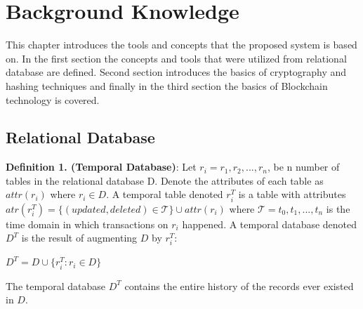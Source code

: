 \chapter{Background Knowledge}
\label{chap:background}

This chapter introduces the tools and concepts that the proposed system is based on. In the first section the concepts and tools that were utilized from relational database are defined. Second section introduces the basics of cryptography and hashing techniques and finally in the third section the basics of Blockchain technology is covered.


\section{Relational Database}


\textbf {Definition 1. (Temporal Database)}:
Let $ r_i = r_1, r_2, ... , r_n$, be n number of tables in the relational database D. Denote the attributes of each table as $attr(r_i)$ where $r_i \in D$. A temporal table denoted $r_i^T$ is a table with attributes $atr(r_i^T) = \{ (updated, deleted) \in \mathcal{T} \}\cup attr(r_i)$ where $\mathcal{T} = t_0,t_1,...,t_n$ is the time domain in which transactions on $r_i$ happened. A temporal database denoted $D^T$ is the result of augmenting $D$ by $r_i^T$:\\
\begin{center}
	{$D^T = D \cup \{{r_i^T}: r_i \in D \}$}
\end{center}
The temporal database $D^T$ contains the entire history of the records ever existed in $D$.\\

